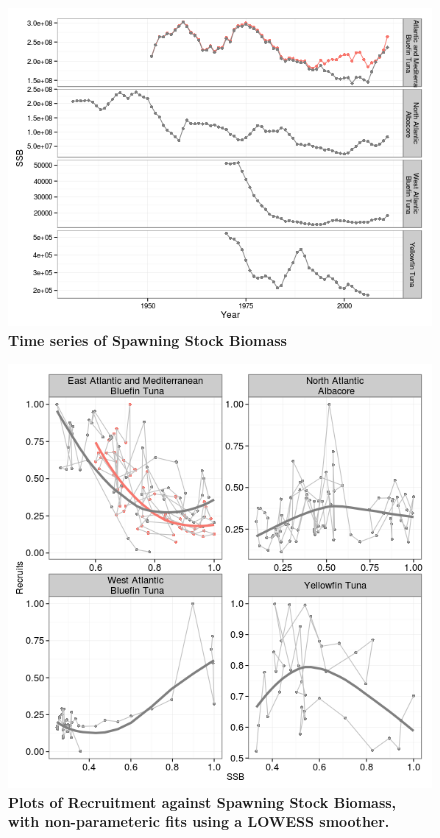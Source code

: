 \documentclass[a4paper, 10pt]{article}
\begin{document}
\begin{figure}[!ht]\begin{center} 
\includegraphics{figs/sr-ssb.png}
\end{center}
\caption{\bf{Time series of Spawning Stock Biomass}}
\label{ssb}\end{figure} 

\begin{figure}[!ht]\begin{center} 
\includegraphics{figs/sr-np-sr.png}
\end{center}
\caption{\bf{Plots of Recruitment against Spawning Stock Biomass, with non-parameteric fits using a LOWESS smoother.}}
\label{sr}\end{figure} 
\end{document}
